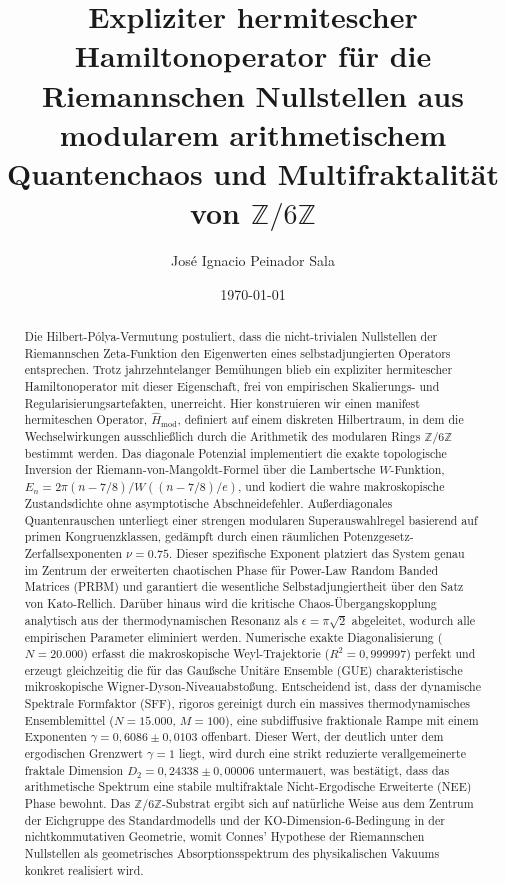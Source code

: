 \documentclass[aps,prl,preprint,superscriptaddress,floatfix]{revtex4-2}
\newcommand{\Zmod}{\mathbb{Z}/6\mathbb{Z}}
\begin{document}
\title{Expliziter hermitescher Hamiltonoperator für die Riemannschen Nullstellen aus modularem arithmetischem Quantenchaos und Multifraktalität von \texorpdfstring{$\Zmod$}{Z/6Z}}

\author{José Ignacio Peinador Sala }

\date{\today}

\begin{abstract}
Die Hilbert-Pólya-Vermutung postuliert, dass die nicht-trivialen Nullstellen der Riemannschen Zeta-Funktion den Eigenwerten eines selbstadjungierten Operators entsprechen. Trotz jahrzehntelanger Bemühungen blieb ein expliziter hermitescher Hamiltonoperator mit dieser Eigenschaft, frei von empirischen Skalierungs- und Regularisierungsartefakten, unerreicht. Hier konstruieren wir einen manifest hermiteschen Operator, $\hat{H}_{\text{mod}}$, definiert auf einem diskreten Hilbertraum, in dem die Wechselwirkungen ausschließlich durch die Arithmetik des modularen Rings $\mathbb{Z}/6\mathbb{Z}$ bestimmt werden. Das diagonale Potenzial implementiert die exakte topologische Inversion der Riemann-von-Mangoldt-Formel über die Lambertsche $W$-Funktion, $E_n = 2\pi (n - 7/8) / W((n - 7/8)/e)$, und kodiert die wahre makroskopische Zustandsdichte ohne asymptotische Abschneidefehler. Außerdiagonales Quantenrauschen unterliegt einer strengen modularen Superauswahlregel basierend auf primen Kongruenzklassen, gedämpft durch einen räumlichen Potenzgesetz-Zerfallsexponenten $\nu = 0.75$. Dieser spezifische Exponent platziert das System genau im Zentrum der erweiterten chaotischen Phase für Power-Law Random Banded Matrices (PRBM) und garantiert die wesentliche Selbstadjungiertheit über den Satz von Kato-Rellich. Darüber hinaus wird die kritische Chaos-Übergangskopplung analytisch aus der thermodynamischen Resonanz als $\epsilon = \pi \sqrt{2}$ abgeleitet, wodurch alle empirischen Parameter eliminiert werden. Numerische exakte Diagonalisierung ($N=20.000$) erfasst die makroskopische Weyl-Trajektorie ($R^2 = 0,999997$) perfekt und erzeugt gleichzeitig die für das Gaußsche Unitäre Ensemble (GUE) charakteristische mikroskopische Wigner-Dyson-Niveauabstoßung. Entscheidend ist, dass der dynamische Spektrale Formfaktor (SFF), rigoros gereinigt durch ein massives thermodynamisches Ensemblemittel ($N=15.000$, $M=100$), eine subdiffusive fraktionale Rampe mit einem Exponenten $\gamma = 0,6086 \pm 0,0103$ offenbart. Dieser Wert, der deutlich unter dem ergodischen Grenzwert $\gamma=1$ liegt, wird durch eine strikt reduzierte verallgemeinerte fraktale Dimension $D_2 = 0,24338 \pm 0,00006$ untermauert, was bestätigt, dass das arithmetische Spektrum eine stabile multifraktale Nicht-Ergodische Erweiterte (NEE) Phase bewohnt. Das $\Zmod$-Substrat ergibt sich auf natürliche Weise aus dem Zentrum der Eichgruppe des Standardmodells und der KO-Dimension-6-Bedingung in der nichtkommutativen Geometrie, womit Connes' Hypothese der Riemannschen Nullstellen als geometrisches Absorptionsspektrum des physikalischen Vakuums konkret realisiert wird.
\end{abstract}
\end{document}
